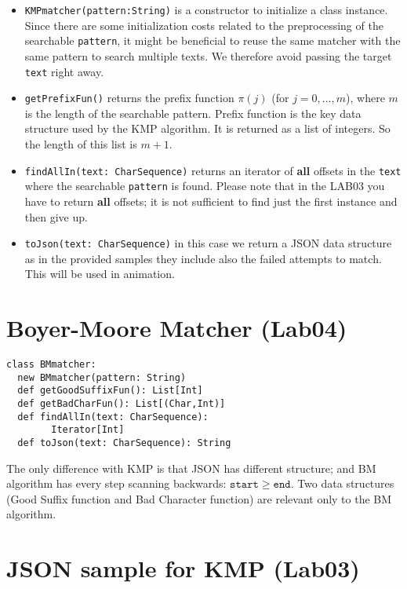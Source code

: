 \documentclass[jou]{apa6}
\begin{document}
\begin{itemize}
\item {\tt KMPmatcher(pattern:String)} is a constructor to 
initialize a class instance. Since there are some initialization costs
related to the preprocessing of the searchable {\tt pattern}, 
it might be beneficial to reuse the same matcher with the same 
pattern to search multiple texts. We therefore avoid passing 
the target {\tt text} right away.
\item {\tt getPrefixFun()} returns the prefix function $\pi(j)$ (for $j=0,\ldots,m$), 
where $m$ is the length of the searchable pattern. 
Prefix function is the key data structure used by the KMP algorithm. 
It is returned as a list of integers. So the length of this
list is $m+1$.
\item {\tt findAllIn(text: CharSequence)} returns an iterator of 
{\bf all} offsets in the {\tt text} where the searchable {\tt pattern} is found. 
Please note that in the LAB03 you have to return {\bf all} offsets; 
it is not sufficient to find just the first instance and then give up.
\item {\tt toJson(text: CharSequence)} in this case we return a 
JSON data structure as in the provided samples \textendash{} they include
also the failed attempts to match. This will be used in animation.

\end{itemize}


\section{Boyer-Moore Matcher (Lab04)}

\begin{verbatim}
class BMmatcher:
  new BMmatcher(pattern: String)
  def getGoodSuffixFun(): List[Int]
  def getBadCharFun(): List[(Char,Int)]
  def findAllIn(text: CharSequence): 
        Iterator[Int]
  def toJson(text: CharSequence): String
\end{verbatim}

The only difference with KMP is that 
JSON has different structure; and BM algorithm has 
every step scanning backwards: $\mathtt{start} \geq \mathtt{end}$.
Two data structures (Good Suffix function and Bad Character function)
are relevant only to the BM algorithm.

\section{JSON sample for KMP (Lab03)}
\end{document}
